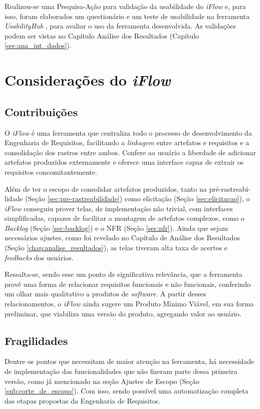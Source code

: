 Realizou-se uma Pesquisa-Ação para validação da usabilidade do \textit{iFlow} e, para isso, foram elaborados um questionário e um teste de usabilidade na ferramenta \textit{UsabilityHub} \cite{usability}, para avaliar o uso da ferramenta desenvolvida. As validações podem ser vistas no Capítulo Análise dos Resultados (Capítulo \ref{sec:ana_int_dados}).

\section{Considerações do \textit{iFlow}}

\subsection{Contribuições}
O \textit{iFlow} é uma ferramenta que centraliza todo o processo de desenvolvimento da Engenharia de Requisitos, facilitando a \textit{linkagem} entre artefatos e requisitos e a consolidação dos rastros entre ambos. Confere ao usuário a liberdade de adicionar artefatos produzidos externamente e oferece uma interface capaz de extrair os requisitos concomitantemente.

Além de ter o escopo de consolidar artefatos produzidos, tanto na pré-rastreabi-lidade (Seção \ref{sec:pre-rastreabilidade}) como elicitação (Seção \ref{sec:elicitacao}), o \textit{iFlow} conseguiu prover telas, de implementação não trivial, com interfaces simplificadas, capazes de facilitar a montagem de artefatos complexos, como o \textit{Backlog} (Seção \ref{sec:backlog}) e o NFR (Seção \ref{sec:nfr}). Ainda que sejam necessários ajustes, como foi revelado no Capítulo de Análise dos Resultados (Seção \ref{chap:analise_resultados}), as telas tiveram alta taxa de acertos e \textit{feedbacks} dos usuários.

Ressalta-se, sendo esse um ponto de significativa relevância, que a ferramenta provê uma forma de relacionar requisitos funcionais e não funcionais, conferindo um olhar mais qualitativo a produtos de \textit{software}. A partir desses relacionamentos, o \textit{iFlow} ainda sugere um Produto Mínimo Viável, em sua forma preliminar, que viabiliza uma versão do produto, agregando valor ao usuário.

\subsection{Fragilidades}

Dentre os pontos que necessitam de maior atenção na ferramenta, há necessidade de implementação das funcionalidades que não fizeram parte dessa primeira versão, como já mencionado na seção Ajustes de Escopo (Seção \ref{sub:corte_de_escopo}). Com isso, sendo possível uma automatização completa das etapas propostas da Engenharia de Requisitos.

